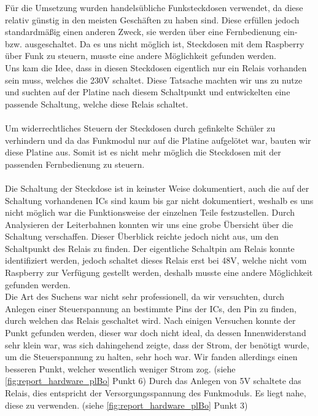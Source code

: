 \label{sec:report_hardware_th}

Für die Umsetzung wurden handelsübliche Funksteckdosen verwendet, da diese relativ günstig in den meisten Geschäften zu haben sind. Diese erfüllen jedoch standardmäßig einen anderen Zweck, sie werden über eine Fernbedienung ein- bzw. ausgeschaltet. Da es uns nicht möglich ist, Steckdosen mit dem Raspberry über Funk zu steuern, musste eine andere Möglichkeit gefunden werden.\\
Uns kam die Idee, dass in diesen Steckdosen eigentlich nur ein Relais vorhanden sein muss, welches die 230V schaltet. Diese Tatsache machten wir uns zu nutze und suchten auf der Platine nach diesem Schaltpunkt und entwickelten eine passende Schaltung, welche diese Relais schaltet.\\\\
Um widerrechtliches Steuern der Steckdosen durch gefinkelte Schüler zu verhindern und da das Funkmodul nur auf die Platine aufgelötet war, bauten wir diese Platine aus. Somit ist es nicht mehr möglich die Steckdosen mit der passenden Fernbedienung zu steuern.\\\\
Die Schaltung der Steckdose ist in keinster Weise dokumentiert, auch die auf der Schaltung vorhandenen ICs sind kaum bis gar nicht dokumentiert, weshalb es uns nicht möglich war die Funktionsweise der einzelnen Teile festzustellen. Durch Analysieren der Leiterbahnen konnten wir uns eine grobe Übersicht über die Schaltung verschaffen. Dieser Überblick reichte jedoch nicht aus, um den Schaltpunkt des Relais zu finden. Der eigentliche Schaltpin am Relais konnte identifiziert werden, jedoch schaltet dieses Relais erst bei 48V, welche nicht vom Raspberry zur Verfügung gestellt werden, deshalb musste eine andere Möglichkeit gefunden werden.\\
Die Art des Suchens war nicht sehr professionell, da wir versuchten, durch Anlegen einer Steuerspannung an bestimmte Pins der ICs, den Pin zu finden, durch welchen das Relais geschaltet wird. Nach einigen Versuchen konnte der Punkt gefunden werden, dieser war doch nicht ideal, da dessen Innenwiderstand sehr klein war, was sich dahingehend zeigte, dass der Strom, der benötigt wurde, um die Steuerspannung zu halten, sehr hoch war. Wir fanden allerdings einen besseren Punkt, welcher wesentlich weniger Strom zog. (siehe \autoref{fig:report_hardware_plBo} Punkt 6) Durch das Anlegen von 5V schaltete das Relais, dies entspricht der Versorgungsspannung des Funkmoduls. Es liegt nahe, diese zu verwenden. (siehe \autoref{fig:report_hardware_plBo} Punkt 3)\\\\
